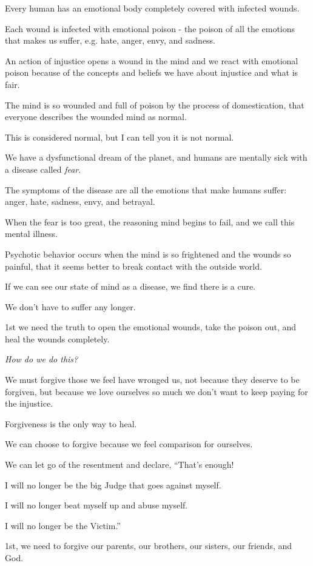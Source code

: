\documentclass{article}
\numberwithin{equation}{section}
\begin{document}
Every human has an emotional body completely covered with infected wounds.

Each wound is infected with emotional poison - the poison of all the emotions that makes us suffer, e.g. hate, anger, envy, and sadness.

An action of injustice opens a wound in the mind and we react with emotional poison because of the concepts and beliefs we have about injustice and what is fair.

The mind is so wounded and full of poison by the process of domestication, that everyone describes the wounded mind as normal.

This is considered normal, but I can tell you it is not normal.

%
We have a dysfunctional dream of the planet, and humans are mentally sick with a disease called \textit{fear}.

The symptoms of the disease are all the emotions that make humans suffer: anger, hate, sadness, envy, and betrayal.

When the fear is too great, the reasoning mind begins to fail, and we call this mental illness.

Psychotic behavior occurs when the mind is so frightened and the wounds so painful, that it seems better to break contact with the outside world.

%
If we can see our state of mind as a disease, we find there is a cure.

We don't have to suffer any longer.

1st we need the truth to open the emotional wounds, take the poison out, and heal the wounds completely.

\textit{How do we do this?}

We must forgive those we feel have wronged us, not because they deserve to be forgiven, but because we love ourselves so much we don't want to keep paying for the injustice.

%
Forgiveness is the only way to heal.

We can choose to forgive because we feel comparison for ourselves.

We can let go of the resentment and declare, ``That's enough!

I will no longer be the big Judge that goes against myself.

I will no longer beat myself up and abuse myself.

I will no longer be the Victim.''

%
1st, we need to forgive our parents, our brothers, our sisters, our friends, and God.
\end{document}
